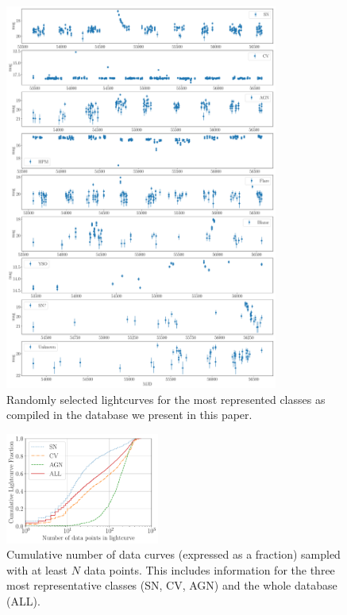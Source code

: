 \documentclass[a4paper,fleqn,usenatbib]{mnras}
\begin{document}
\begin{figure}
  \includegraphics[width=0.8\textwidth]{examples.pdf}
  \caption{Randomly selected lightcurves for the most represented classes as
    compiled in the database we present in this paper.}  
  \label{fig:examples}
\end{figure} 

\begin{figure}
  \includegraphics[width=0.45\textwidth]{cumulative_classes.pdf}
  \caption{Cumulative number of data curves (expressed as a fraction)
    sampled with at least $N$ data points. This includes information
    for the three most representative classes (SN, CV, AGN) and the
    whole database (ALL).}
  \label{fig:cumulative}
\end{figure} 
\end{document}

